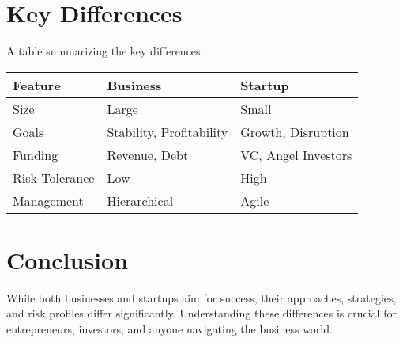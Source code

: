 \documentclass{article}
\begin{document}
\section{Key Differences}

A table summarizing the key differences:

\begin{tabular}{|l|l|l|}
\hline
Feature & Business & Startup \\
\hline
Size & Large & Small \\
Goals & Stability, Profitability & Growth, Disruption \\
Funding & Revenue, Debt & VC, Angel Investors \\
Risk Tolerance & Low & High \\
Management & Hierarchical & Agile \\
\hline
\end{tabular}


\section{Conclusion}

While both businesses and startups aim for success, their approaches, strategies, and risk profiles differ significantly. Understanding these differences is crucial for entrepreneurs, investors, and anyone navigating the business world.
\end{document}

